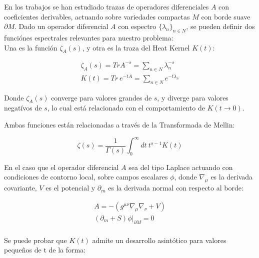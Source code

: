 En los trabajos \cite{ Seeley:1967ea,10.2307/2373309,10.2307/2373312} se han estudiado trazas de operadores diferenciales $A$ con coeficientes derivables, actuando sobre variedades compactas $M$ con borde suave $\partial M$. Dado un operador diferencial $A$ con espectro $ \{ \lambda _n \} _{n \in N}$, se pueden definir dos funciónes espectrales relevantes para nuestro problema: \\


Una es la función $ \zeta _A (s)$, y otra es la traza del Heat Kernel $K(t)$:

\begin{equation}
\begin{array}{c}
\zeta _A (s) = Tr A ^{-s} = \sum \limits_{n \in N}   \lambda _n ^{-s} \\[10pt]
K (t) =  Tr \ e ^{-t A} = \sum \limits_{n \in N} e ^{-t \lambda _{n} }
\end{array}
\label{funcion.zeta}
\end{equation}

Donde $\zeta _A (s) $ converge para valores grandes de $s$, y diverge para valores negatívos de $s$, lo cual está relacionado con el comportamiento de $K(t \rightarrow 0 )$. 


Ambas funciones están relacionadas a través de la Transformada de Mellin:




\begin{equation}
\zeta (s) = \frac{1}{\Gamma (s) } 
\int _0 ^{\infty} dt \
t ^{s-1} K(t) 
\end{equation}


En el caso que el operador diferencial $A$ sea del tipo Laplace actuando con condiciones de contorno local, sobre campos escalares $\phi $, donde $\nabla _{\mu}$ es la derivada covariante, $V$ es el potencial y $\partial _m$ es la derivada normal con respecto al borde:



\begin{equation}
\begin{array}{c}

A = - \left(
			g ^{\mu \nu} \nabla _{\mu} \nabla _{\nu} + V
			\right) \\
\left (\partial _m + S \right) \phi | _{\partial M} = 0 \\[10pt]

\end{array}
\end{equation}

Se puede probar que $K(t)$ admite un desarrollo asintótico para valores pequeños de t  de la forma:


